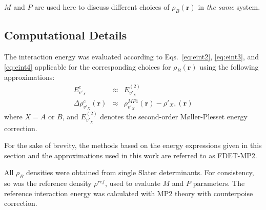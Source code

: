 \documentclass[amsmath,amssymb,preprint,aip,jcp]{revtex4-1}
\begin{document}
$M$ and $P$ are used here to discuss different choices of $\rho_{B}(\mathbf{r})$ in {\it the same} system. 
\subsection{Computational Details}
The interaction energy was evaluated according to Eqs.~\ref{eq:eint2}, \ref{eq:eint3}, and \ref{eq:eint4} applicable for the corresponding choices for $\rho_B(\mathbf{r})$ using the following approximations:
\begin{eqnarray}
E^{c}_{v'_X}&\approx&E_{v'_X}^{(2)} \label{eq:appr_ec}\\
\Delta \rho^{c}_{v'_X}(\mathbf{r})&\approx&\rho_{v'_X}^{MP1}(\mathbf{r})-\rho'_{X},(\mathbf{r}) \label{eq:appr_rc}
\end{eqnarray}
where $X=A$ or $B$, and $E_{v'_X}^{(2)}$ denotes the second-order M{\o}ller-Plesset energy correction.

For the sake of brevity, the methods based on the energy expressions given in this section and the approximations used in this work are referred to as FDET-MP2. 

All $\rho_B$ densities were obtained from single Slater determinants. For consistency, so was the reference density $\rho^{ref}$, used to evaluate $M$ and $P$ parameters.
The reference interaction energy was calculated with MP2 theory with counterpoise correction.
\end{document}
